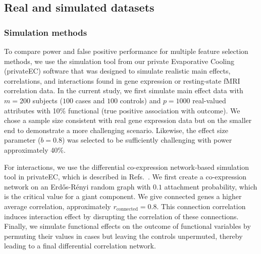 \documentclass[10pt]{article}
\begin{document}
\subsection{Real and simulated datasets}
\subsubsection{Simulation methods}
To compare power and false positive performance for multiple feature selection methods, we use the simulation tool from our private Evaporative Cooling (privateEC) software \cite{le17} that was designed to simulate realistic main effects, correlations, and interactions found in gene expression or resting-state fMRI correlation data. In the current study, we first simulate main effect data with $m=200$ subjects ($100$ cases and $100$ controls) and $p=1000$ real-valued attributes with 10\% functional (true positive association with outcome).
We chose a sample size consistent with real gene expression data but on the smaller end to demonstrate a more challenging scenario.
Likewise, the effect size parameter ($b=0.8$) was selected to be sufficiently challenging with power approximately 40\%. 

For interactions, we use the differential co-expression network-based simulation tool in privateEC, which is described in Refs.~\cite{le17, lareau15}. 
We first create a co-expression network on an Erd\H{o}s-R\'enyi random graph with $0.1$ attachment probability, which is the critical value for a giant component.
We give connected genes a higher average correlation, approximately $r_{\text{connected}}=0.8$. %
This connection correlation induces interaction effect by disrupting the correlation of these connections. %
Finally, we simulate functional effects on the outcome of functional variables by permuting their values in cases but leaving the controls unpermuted, thereby leading to a final differential correlation network. 
\end{document}
